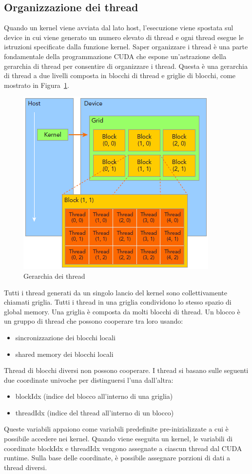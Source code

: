 \subsection{Organizzazione dei thread}
Quando un kernel viene avviata dal lato host, l'esecuzione viene spostata sul device in cui viene generato un numero elevato di thread e ogni thread esegue le istruzioni specificate dalla funzione kernel. Saper organizzare i thread è una parte fondamentale della programmazione CUDA che espone un'astrazione della gerarchia di thread per consentire di organizzare i thread. Questa è una gerarchia di thread a due livelli composta in blocchi di thread e griglie di blocchi, come mostrato in Figura~\ref{fig:Thread_hierarchy}.
\begin{figure}[h!]
	\centering
	\includegraphics[width=.7\textwidth]{Immagini/CUDA/Thread_hierarchy}
	\caption{Gerarchia dei thread \cite{Cheng:ProfessionalCudaProgramming}}
	\label{fig:Thread_hierarchy}
\end{figure}
Tutti i thread generati da un singolo lancio del kernel sono collettivamente chiamati griglia. Tutti i thread in una griglia condividono lo stesso spazio di global memory. Una griglia è composta da molti blocchi di thread. Un blocco è un gruppo di thread che possono cooperare tra loro usando:
\begin{itemize}
	\item sincronizzazione dei blocchi locali
	\item shared memory dei blocchi locali
\end{itemize}
Thread di blocchi diversi non possono cooperare. I thread si basano sulle seguenti due coordinate univoche per distinguersi l'una dall'altra:
\begin{itemize}
	\item blockIdx (indice del blocco all'interno di una griglia)
	\item threadIdx (indice del thread all'interno di un blocco)
\end{itemize}
Queste variabili appaiono come variabili predefinite pre-inizializzate a cui è possibile accedere nei kernel. Quando viene eseguita un kernel, le variabili di coordinate blockIdx e threadIdx vengono assegnate a ciascun thread dal CUDA runtime. Sulla base delle coordinate, è possibile assegnare porzioni di dati a thread diversi.

